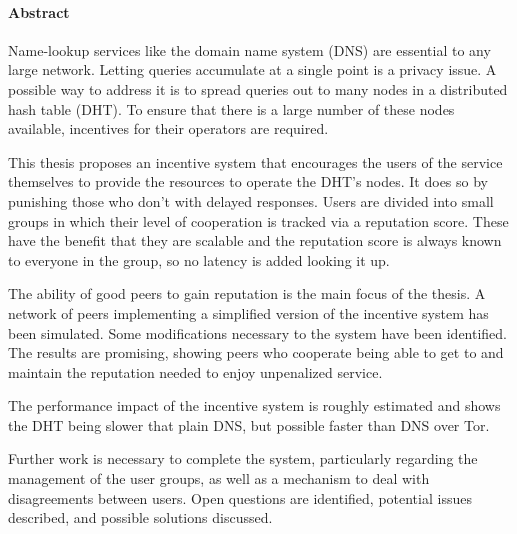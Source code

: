 \cleardoublepage

\begin{center}
\paragraph{Abstract}
\hrulefill
\end{center}
Name-lookup services like the domain name system (DNS) are essential to any
large network. Letting queries accumulate at a single point is a privacy issue.
A possible way to address it is to spread queries out to many nodes in a
distributed hash table (DHT). To ensure that there is a large number of these
nodes available, incentives for their operators are required.

This thesis proposes an incentive system that encourages the users of the
service themselves to provide the resources to operate the DHT's nodes. It does
so by punishing those who don't with delayed responses. Users are divided into
small groups in which their level of cooperation is tracked via a reputation
score. These have the benefit that they are scalable and the reputation score is
always known to everyone in the group, so no latency is added looking it up.

The ability of good peers to gain reputation is the main focus of the thesis. A
network of peers implementing a simplified version of the incentive system has
been simulated. Some modifications necessary to the system have been identified.
The results are promising, showing peers who cooperate being able to get to and
maintain the reputation needed to enjoy unpenalized service.

The performance impact of the incentive system is roughly estimated and shows
the DHT being slower that plain DNS, but possible faster than DNS over Tor.

Further work is necessary to complete the system, particularly regarding the
management of the user groups, as well as a mechanism to deal with
disagreements between users. Open questions are identified, potential issues
described, and possible solutions discussed.
